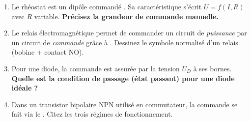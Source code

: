 \documentclass[11pt]{article}
\begin{document}
\begin{exercice}
\begin{enumerate}
    \item Le rhéostat est un dipôle commandé \underline{\hspace{2cm}}. Sa caractéristique s'écrit $U = f(I, R)$ avec $R$ variable. \textbf{Précisez la grandeur de commande manuelle.}
    \item Le relais électromagnétique permet de commander un circuit de \textit{puissance} par un circuit de \textit{commande} grâce à \underline{\hspace{3cm}}. Dessinez le symbole normalisé d'un relais (bobine + contact NO).
    \item Pour une diode, la commande est assurée par la tension $U_D$ à ses bornes. \textbf{Quelle est la condition de passage (état passant) pour une diode idéale ?}
    \item Dans un transistor bipolaire NPN utilisé en commutateur, la commande se fait via le \underline{\hspace{2cm}}. Citez les trois régimes de fonctionnement.
\end{enumerate}
\end{exercice}
\end{document}
